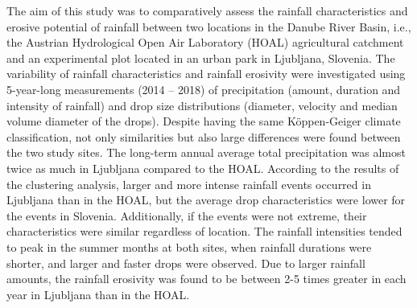 {}
\begin{flushleft}








\end{flushleft}

\noindent

The aim of this study was to comparatively assess the rainfall characteristics and erosive potential of rainfall between two locations in the Danube River Basin, i.e., the Austrian Hydrological Open Air Laboratory (HOAL) agricultural catchment and an experimental plot located in an urban park in Ljubljana, Slovenia. The variability of rainfall characteristics and rainfall erosivity were investigated using 5-year-long measurements (2014 – 2018) of precipitation (amount, duration and intensity of rainfall) and drop size distributions (diameter, velocity and median volume diameter of the drops). Despite having the same Köppen-Geiger climate classification, not only similarities but also large differences were found between the two study sites. The long-term annual average total precipitation was almost twice as much in Ljubljana compared to the HOAL. According to the results of the clustering analysis, larger and more intense rainfall events occurred in Ljubljana than in the HOAL, but the average drop characteristics were lower for the events in Slovenia. Additionally, if the events were not extreme, their characteristics were similar regardless of location. The rainfall intensities tended to peak in the summer months at both sites, when rainfall durations were shorter, and larger and faster drops were observed. Due to larger rainfall amounts, the rainfall erosivity was found to be between 2-5 times greater in each year in Ljubljana than in the HOAL. 

